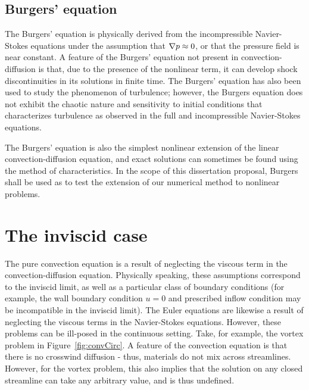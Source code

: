 \subsection{Burgers' equation}

The Burgers' equation is physically derived from the incompressible Navier-Stokes equations under the assumption that $\grad p \approx 0$, or that the pressure field is near constant. A feature of the Burgers' equation not present in convection-diffusion is that, due to the presence of the nonlinear term, it can develop shock discontinuities in its solutions in finite time.  The Burgers' equation has also been used to study the phenomenon of turbulence; however, the Burgers equation does not exhibit the chaotic nature and sensitivity to initial conditions that characterizes turbulence as observed in the full and incompressible Navier-Stokes equations. 

The Burgers' equation is also the simplest nonlinear extension of the linear convection-diffusion equation, and exact solutions can sometimes be found using the method of characteristics. In the scope of this dissertation proposal, Burgers shall be used as to test the extension of our numerical method to nonlinear problems. 

\section{The inviscid case}

The pure convection equation is a result of neglecting the viscous term in the convection-diffusion equation. Physically speaking, these assumptions correspond to the inviscid limit, as well as a particular class of boundary conditions (for example, the wall boundary condition $u = 0$ and prescribed inflow condition may be incompatible in the inviscid limit).  The Euler equations are likewise a result of neglecting the viscous terms in the Navier-Stokes equations.  However, these problems can be ill-posed in the continuous setting.  Take, for example, the vortex problem in Figure~\ref{fig:convCirc}.  A feature of the convection equation is that there is no crosswind diffusion - thus, materials do not mix across streamlines.  However, for the vortex problem, this also implies that the solution on any closed streamline can take any arbitrary value, and is thus undefined. 

